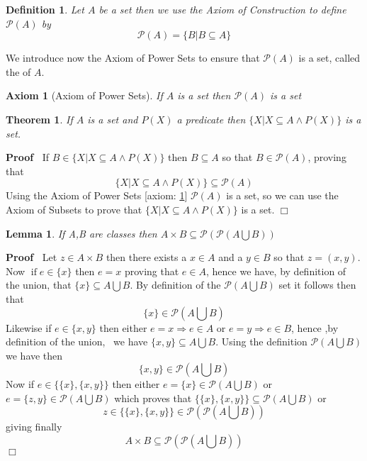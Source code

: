 \documentclass{book}
\newcommand{\tmop}[1]{\ensuremath{\operatorname{#1}}}
\newcommand{\tmtextbf}[1]{\text{{\bfseries{#1}}}}
\newenvironment{proof}{\noindent\textbf{Proof\ }}{\hspace*{\fill}$\Box$\medskip}
\newtheorem{axiom}{Axiom}
{\theorembodyfont{\rmfamily}\newtheorem{convention}{Convention}}
\newtheorem{definition}{Definition}
{\theorembodyfont{\rmfamily}\newtheorem{example}{Example}}
\newtheorem{lemma}{Lemma}
\newtheorem{theorem}{Theorem}
\begin{document}
\begin{definition}
  \label{power set}{}{}Let $A$ be a
  set then we use the Axiom of Construction to define $\mathcal{P} (A)$ by
  \[ \mathcal{P} (A) = \{ B|B \subseteq A \} \]
\end{definition}

We introduce now the Axiom of Power Sets to ensure that $\mathcal{P} (A)$ is a
set, called the \tmtextbf{power set} of $A$.

\begin{axiom}[Axiom of Power Sets]
  \label{axiom of power}{}If $A$ is a set then
  $\mathcal{P} (A)$ is a set
\end{axiom}

\begin{theorem}
  \label{set restriction of a set of sets}If $A$ is a set and $P (X)$ a
  predicate then $\{ X|X \subseteq A \wedge P (X) \}$ is a set.
\end{theorem}

\begin{proof}
  If $B \in \{ X|X \subseteq A \wedge P (X) \}$ then $B \subseteq A$ so that
  $B \in \mathcal{P} (A)$, proving that
  \[ \{ X|X \subseteq A \wedge P (X) \} \subseteq \mathcal{P} (A) \]
  Using the Axiom of Power Sets [axiom: \ref{axiom of power}] $\mathcal{P}
  (A)$ is a set, so we can use the Axiom of Subsets to prove that $\{ X|X
  \subseteq A \wedge P (X) \}$ is a set.
\end{proof}

\begin{lemma}
  \label{set A*B is subset of P(P(AUB))}If A,B are classes then $A \times B
  \subseteq \mathcal{P} \left( \mathcal{P} \left( A \bigcup B \right) \right)$
\end{lemma}

\begin{proof}
  Let $z \in A \times B$ then there exists a $x \in A$ and a $y \in B$ so that
  $z = (x, y)$. Now $\tmop{if} e \in \{ x \}$ then $e = x$ proving that $e \in
  A$, hence we have, by definition of the union, that $\{ x \} \subseteq A
  \bigcup B$. By definition of the $\mathcal{P} \left( A \bigcup B \right)$
  set it follows then that
  \[ \{ x \} \in \mathcal{P} \left( A \bigcup B \right) \]
  Likewise if $e \in \{ x, y \}$ then either $e = x \Rightarrow e \in A$ or $e
  = y \Rightarrow e \in B$, hence ,by definition of the union, \ we have $\{
  x, y \} \subseteq A \bigcup B$. Using the definition $\mathcal{P} \left( A
  \bigcup B \right)$ we have then
  \[ \{ x, y \} \in \mathcal{P} \left( A \bigcup B \right) \]
  Now if $e \in \{ \{ x \}, \{ x, y \} \}$ then either $e = \{ x \} \in
  \mathcal{P} \left( A \bigcup B \right)$ or $e = \{ z, y \} \in \mathcal{P}
  \left( A \bigcup B \right)$ which proves that $\{ \{ x \}, \{ x, y \} \}
  \subseteq \mathcal{P} \left( A \bigcup B \right)$ or
  \[ z \in \{ \{ x \}, \{ x, y \} \} \in \mathcal{P} \left( \mathcal{P}
     \left( A \bigcup B \right) \right) \]
  giving finally
  \[ A \times B \subseteq \mathcal{P} \left( \mathcal{P} \left( A \bigcup B
     \right) \right) \]
\end{proof}
\end{document}
